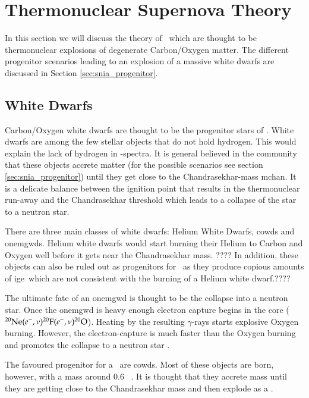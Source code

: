 \section{Thermonuclear Supernova Theory}
In this section we will discuss the theory of \sneia\ which are thought to be thermonuclear explosions of degenerate Carbon/Oxygen matter. The different progenitor scenarios leading to an explosion of a massive white dwarfs are discussed in Section \ref{sec:snia_progenitor}.

\subsection{White Dwarfs}
\label{sec:white_dwarfs}
Carbon/Oxygen white dwarfs are thought to be the progenitor stars of \sneia. White dwarfs are among the few stellar objects that do not hold hydrogen. This would explain the lack of hydrogen in \snia-spectra. It is general believed in the community that these objects accrete matter (for the possible scenarios see section \ref{sec:snia_progenitor}) until they get close to the Chandrasekhar-mass \gls{mchan}. It is a delicate balance between the ignition point that results in the thermonuclear run-away and the Chandrasekhar threshold which leads to a collapse of the star to a neutron star.
 
There are three main classes of white dwarfs: Helium White Dwarfs, \glspl{cowd} and \glspl{onemgwd}. Helium white dwarfs would start burning their Helium to Carbon and Oxygen well before it gets near the Chandrasekhar mass.
???? In addition, these objects can also be ruled out as progenitors for \sneia\ as they produce copious amounts of \gls{ige}\  which are not consistent with the burning of a Helium white dwarf.???? 

The ultimate fate of an \gls{onemgwd} is thought to be the collapse into a neutron star. Once the \gls{onemgwd} is heavy enough electron capture begins in the core ($\Ne(e^-,\nu)\F[20](e^-,\nu)\Ox[20]$). Heating by the resulting $\gamma$-rays starts explosive Oxygen burning. However, the electron-capture is much faster than the Oxygen burning and promotes the collapse to a neutron star \citep{1991ApJ...367L..19N, 2005A&A...435..231G}. 

The favoured progenitor for a \snia\  are \glspl{cowd}. Most of these objects are born, however, with a mass around 0.6 \msun\ \citep{2007MNRAS.375.1315K}. It is thought that they accrete mass until they are getting close to the Chandrasekhar mass and then explode as a \snia.

